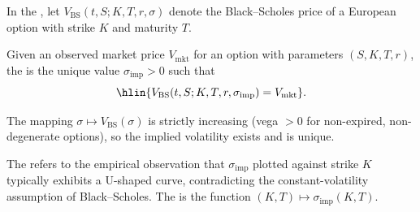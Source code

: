 \begin{definition} \label{definition:implied_volatility_of_a_traded_option}
In the , let $V_{\text{BS}}(t, S; K, T, r, \sigma)$ denote the Black--Scholes price of a European option with strike $K$ and maturity $T$.

Given an observed market price $V_{\text{mkt}}$ for an option with parameters $(S, K, T, r)$, the  is the unique value $\sigma_{\text{imp}} > 0$ such that
$$\hlin{V_{\text{BS}}(t, S; K, T, r, \sigma_{\text{imp}}) = V_{\text{mkt}}}.$$

The mapping $\sigma \mapsto V_{\text{BS}}(\sigma)$ is strictly increasing (vega $> 0$ for non-expired, non-degenerate options), so the implied volatility exists and is unique.

The  refers to the empirical observation that $\sigma_{\text{imp}}$ plotted against strike $K$ typically exhibits a U-shaped curve, contradicting the constant-volatility assumption of Black--Scholes. The  is the function $(K, T) \mapsto \sigma_{\text{imp}}(K, T)$.
\end{definition}
